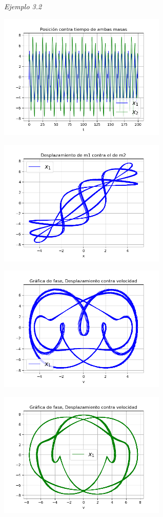 \documentclass[a4paper]{article}
\begin{document}
\textit{Ejemplo 3.2}

\begin{center}
\includegraphics[height=6cm]{ejemplo3-2.png}

\includegraphics[height=6cm]{recta3-2.png}

\includegraphics[height=6cm]{circulo3-2-1.png}

\includegraphics[height=6cm]{circulo3-2-2.png}
\end{center}
\end{document}
